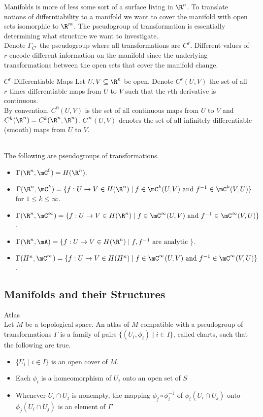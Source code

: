 \documentclass[a4paper]{article}
\begin{document}
Manifolds is more of less some sort of a surface living in $\R^n$. To translate notions of differntiability to a manifold we want to cover the manifold with open sets isomorphic to $\R^m$. The pseudogroup of transformation is essentially determining what structure we want to investigate. \\
Denote $\Gamma_{C^r}$ the pseudogroup where all transformations are $C^r$. Different values of $r$ encode different information on the manifold since the underlying transformations between the open sets that cover the manifold change. 

\begin{defn}{$C^r$-Differentiable Maps}{} Let $U,V\subseteq\R^n$ be open. Denote $C^r(U,V)$ the set of all $r$ times differentiable maps from $U$ to $V$ such that the $r$th derivative is continuous. \\
By convention, $C^0(U,V)$ is the set of all continuous maps from $U$ to $V$ and $C^k(\R^n)=C^k(\R^n,\R^n)$. $C^\infty(U,V)$ denotes the set of all infinitely differentiable (smooth) maps from $U$ to $V$. 
\end{defn}

\begin{eg}{}{}\\
The following are pseudogroups of transformations. 
\begin{itemize}
\item $\Gamma(\R^n,\mC^0)=H(\R^n)$. 
\item $\Gamma(\R^n,\mC^k)=\{f:U\to V\in H(\R^n)\;|\;f\in\mC^k(U,V)\text{ and }f^{-1}\in\mC^k(V,U)\}$ for $1\leq k\leq\infty$. 
\item $\Gamma(\R^n,\mC^\infty)=\{f:U\to V\in H(\R^n)\;|\;f\in\mC^\infty(U,V)\text{ and }f^{-1}\in\mC^\infty(V,U)\}$. 
\item $\Gamma(\R^n,\mA)=\{f:U\to V\in H(\R^n)\;|\;f,f^{-1}\text{ are analytic }\}$. 
\item $\Gamma(H^n,\mC^\infty)=\{f:U\to V\in H(H^n)\;|\;f\in\mC^\infty(U,V)\text{ and }f^{-1}\in\mC^\infty(V,U)\}$. 
\end{itemize}
\end{eg}

\subsection{Manifolds and their Structures}
\begin{defn}{Atlas}{}\\
Let $M$ be a topological space. An atlas of $M$ compatible with a pseudogroup of transformations $\Gamma$ is a family of pairs $\{(U_i,\phi_i)\;|\;i\in I\}$, called charts, such that the following are true. 
\begin{itemize}
\item $\{U_i\;|\;i\in I\}$ is an open cover of $M$. 
\item Each $\phi_i$ is a homeomorphism of $U_i$ onto an open set of $S$
\item Whenever $U_i\cap U_j$ is nonempty, the mapping $\phi_j\circ\phi_i^{-1}$ of $\phi_i(U_i\cap U_j)$ onto $\phi_j(U_i\cap U_j)$ is an element of $\Gamma$
\end{itemize}
\end{defn}
\end{document}
